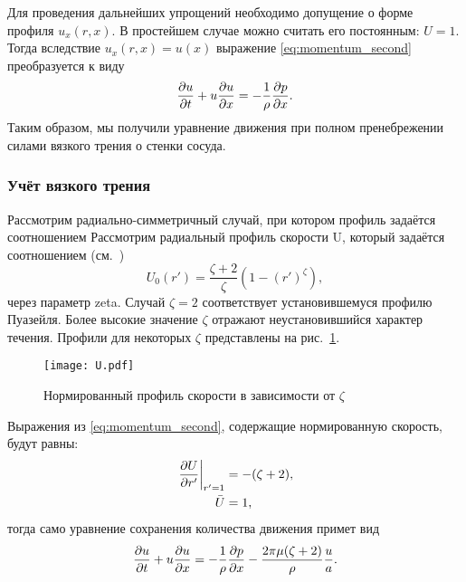 Для проведения дальнейших упрощений необходимо допущение о форме профиля $u_x(r, x)$.
В простейшем случае можно считать его постоянным: $U=1$. Тогда вследствие $u_x(r, x) = u(x)$
выражение \cref{eq:momentum_second} преобразуется к виду
\begin{equation}
\label{eq:momentum_conservation_inviscid}
\frac{\partial u}{\partial t} + u\frac{\partial u}{\partial x} = -\frac{1}{\rho} \frac{\partial p}{\partial x}.
\end{equation}
Таким образом, мы получили уравнение движения при полном пренебрежении
силами вязкого трения о стенки сосуда.

\subsubsection{Учёт вязкого трения}
Рассмотрим радиально-симметричный случай, при котором профиль задаётся соотношением
Рассмотрим радиальный профиль скорости \gls{U}, который задаётся соотношением (см.~\cite{Hughes1973,Smith2001})
\begin{equation}
U_0(r') = \frac{\zeta+2}{\zeta} \left(1 - \left(r'\right)^{\zeta}\right),
\end{equation}
через параметр \gls{zeta}. Случай $\zeta=2$ соответствует установившемуся профилю Пуазейля.
Более высокие значение $\zeta$ отражают неустановившийся характер течения.
Профили для некоторых $\zeta$ представлены на рис.~\ref{fig:U}.


\begin{figure}[h]
    \centering
    \texttt{[image: U.pdf]}
    \caption{Нормированный профиль скорости в зависимости от $\zeta$}
    \label{fig:U}
\end{figure}

Выражения из \cref{eq:momentum_second}, содержащие нормированную скорость, будут равны:
\begin{align*}
\left.\frac{\partial U}{\partial r'}\right|_{r'=1} &= - (\zeta+2),\\
\bar U &= 1,
\end{align*}
тогда само уравнение сохранения количества движения примет вид
\begin{equation}
\label{eq:momentum_conservation_viscous}
\frac{\partial u}{\partial t} + u\frac{\partial u}{\partial x} =
	-\frac{1}{\rho} \frac{\partial p}{\partial x} - \frac{2\pi\mu(\zeta+2)}{\rho}\frac{u}{a}.
\end{equation}

